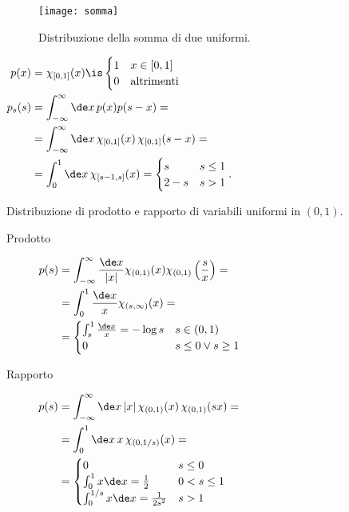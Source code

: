 \begin{solution*}
	\begin{figure}
		\centering
		\texttt{[image: somma]}
		\caption{Distribuzione della somma di due uniformi.}
	\end{figure}
	$\begin{aligned}[t]
		p(x) &= \chi_{[0,1]}(x) \is \begin{cases}
			1 & x \in [0,1] \\
			0 & \text{altrimenti}
		\end{cases} \\
		p_s(s) &= \int_{-\infty}^{\infty}\de x\, p(x)p(s-x) = \\
		&= \int_{-\infty}^{\infty}\de x\, \chi_{[0,1]}(x)\, \chi_{[0,1]}(s-x) = \\
		&= \int_0^1 \de x\, \chi_{[s-1,s]}(x) = \begin{cases}
			s & s\le1 \\
			2-s & s>1
		\end{cases}.
	\end{aligned}$
\end{solution*}

\begin{exercise}
	Distribuzione di prodotto e rapporto di variabili uniformi in $(0,1)$.
\end{exercise}

\begin{solution}
	\begin{description}
		\item[Prodotto]
			$\begin{aligned}[t]
				p(s) &= \int_{-\infty}^\infty \frac{\de x}{|x|} \chi_{(0,1)}(x)\chi_{(0,1)}\left(\frac sx\right) = \\
				&= \int_0^1 \frac{\de x}{x} \chi_{(s,\infty)}(x) = \\
				&= \begin{cases}
					\int_s^1\frac{\de x}x = -\log s & s \in (0,1) \\
					0 & s \le 0 \vee s \ge 1
				\end{cases}
			\end{aligned}$
		\item[Rapporto]
			$\begin{aligned}[t]
				p(s) &= \int_{-\infty}^\infty \de x\,|x|\,\chi_{(0,1)}(x)\,\chi_{(0,1)}(sx) = \\
				&= \int_0^1 \de x\,x\,\chi_{(0,1/s)}(x) = \\
				&= \begin{cases}
					0 & s \le 0 \\
					\int_0^1 x\de x = \frac12 & 0 < s \le 1 \\
					\int_0^{1/s} x\de x = \frac1{2s^2} & s > 1
				\end{cases}
			\end{aligned}$
	\end{description}
\end{solution}

